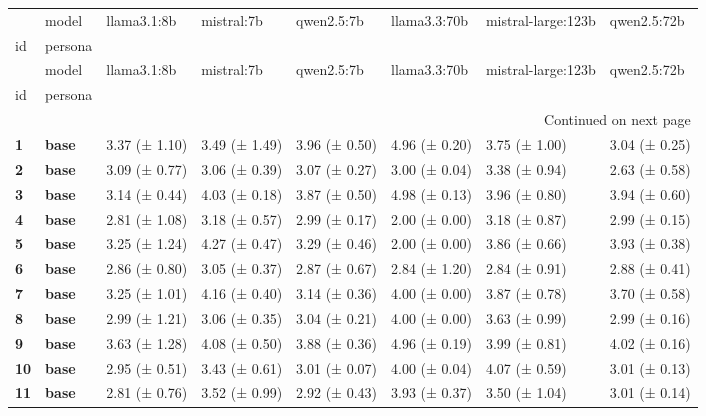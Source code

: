 \begin{longtable}{llllllll}
\toprule
 & model & llama3.1:8b & mistral:7b & qwen2.5:7b & llama3.3:70b & mistral-large:123b & qwen2.5:72b \\
id & persona &  &  &  &  &  &  \\
\midrule
\endfirsthead
\toprule
 & model & llama3.1:8b & mistral:7b & qwen2.5:7b & llama3.3:70b & mistral-large:123b & qwen2.5:72b \\
id & persona &  &  &  &  &  &  \\
\midrule
\endhead
\midrule
\multicolumn{8}{r}{Continued on next page} \\
\midrule
\endfoot
\bottomrule
\endlastfoot
\textbf{1} & \textbf{base} & 3.37 (± 1.10) & 3.49 (± 1.49) & 3.96 (± 0.50) & 4.96 (± 0.20) & 3.75 (± 1.00) & 3.04 (± 0.25) \\
\cline{1-8}
\textbf{2} & \textbf{base} & 3.09 (± 0.77) & 3.06 (± 0.39) & 3.07 (± 0.27) & 3.00 (± 0.04) & 3.38 (± 0.94) & 2.63 (± 0.58) \\
\cline{1-8}
\textbf{3} & \textbf{base} & 3.14 (± 0.44) & 4.03 (± 0.18) & 3.87 (± 0.50) & 4.98 (± 0.13) & 3.96 (± 0.80) & 3.94 (± 0.60) \\
\cline{1-8}
\textbf{4} & \textbf{base} & 2.81 (± 1.08) & 3.18 (± 0.57) & 2.99 (± 0.17) & 2.00 (± 0.00) & 3.18 (± 0.87) & 2.99 (± 0.15) \\
\cline{1-8}
\textbf{5} & \textbf{base} & 3.25 (± 1.24) & 4.27 (± 0.47) & 3.29 (± 0.46) & 2.00 (± 0.00) & 3.86 (± 0.66) & 3.93 (± 0.38) \\
\cline{1-8}
\textbf{6} & \textbf{base} & 2.86 (± 0.80) & 3.05 (± 0.37) & 2.87 (± 0.67) & 2.84 (± 1.20) & 2.84 (± 0.91) & 2.88 (± 0.41) \\
\cline{1-8}
\textbf{7} & \textbf{base} & 3.25 (± 1.01) & 4.16 (± 0.40) & 3.14 (± 0.36) & 4.00 (± 0.00) & 3.87 (± 0.78) & 3.70 (± 0.58) \\
\cline{1-8}
\textbf{8} & \textbf{base} & 2.99 (± 1.21) & 3.06 (± 0.35) & 3.04 (± 0.21) & 4.00 (± 0.00) & 3.63 (± 0.99) & 2.99 (± 0.16) \\
\cline{1-8}
\textbf{9} & \textbf{base} & 3.63 (± 1.28) & 4.08 (± 0.50) & 3.88 (± 0.36) & 4.96 (± 0.19) & 3.99 (± 0.81) & 4.02 (± 0.16) \\
\cline{1-8}
\textbf{10} & \textbf{base} & 2.95 (± 0.51) & 3.43 (± 0.61) & 3.01 (± 0.07) & 4.00 (± 0.04) & 4.07 (± 0.59) & 3.01 (± 0.13) \\
\cline{1-8}
\textbf{11} & \textbf{base} & 2.81 (± 0.76) & 3.52 (± 0.99) & 2.92 (± 0.43) & 3.93 (± 0.37) & 3.50 (± 1.04) & 3.01 (± 0.14) \\

\end{longtable}
